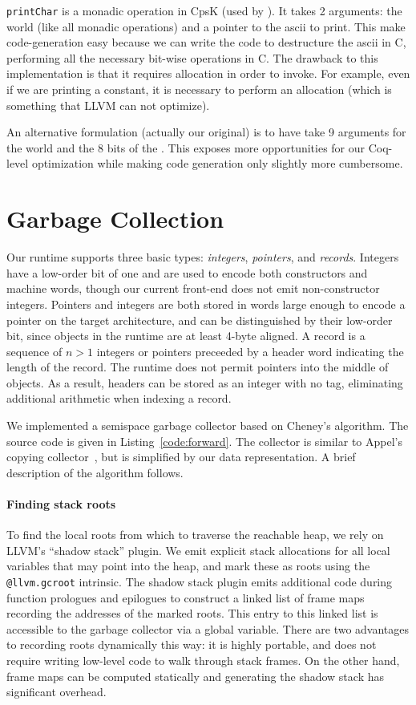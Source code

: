 \documentclass{article}
\begin{document}
\lstinline!printChar! is a monadic operation in CpsK (used by ). It takes 2 arguments: the world (like all monadic operations) and a pointer to the ascii to print. This make code-generation easy because we can write the code to destructure the ascii in C, performing all the necessary bit-wise operations in C. The drawback to this implementation is that it requires allocation in order to invoke. For example, even if we are printing a constant, it is necessary to perform an allocation (which is something that LLVM can not optimize). 

An alternative formulation (actually our original) is to have  take 9 arguments for the world and the 8 bits of the . This exposes more opportunities for our Coq-level optimization while making code generation only slightly more cumbersome. 

\section{Garbage Collection}
\label{sec:gc}

Our runtime supports three basic types: \emph{integers}, \emph{pointers}, and \emph{records}. Integers have a low-order bit of one and are used to encode both constructors and machine words, though our current front-end does not emit non-constructor integers. Pointers and integers are both stored in words large enough to encode a pointer on the target architecture, and can be distinguished by their low-order bit, since objects in the runtime are at least 4-byte aligned. A record is a sequence of $n > 1$ integers or pointers preceeded by a header word indicating the length of the record. The runtime does not permit pointers into the middle of objects. As a result, headers can be stored as an integer with no tag, eliminating additional arithmetic when indexing a record.

We implemented a semispace garbage collector based on Cheney's algorithm. The source code is given in Listing~\ref{code:forward}. The collector is similar to Appel's copying collector~\cite{Appel90aruntime}, but is simplified by our data representation. A brief description of the algorithm follows.

\paragraph{Finding stack roots} To find the local roots from which to traverse the reachable heap, we rely on LLVM's ``shadow stack'' plugin. We emit explicit stack allocations for all local variables that may point into the heap, and mark these as roots using the \lstinline!@llvm.gcroot! intrinsic. The shadow stack plugin emits additional code during function prologues and epilogues to construct a linked list of frame maps recording the addresses of the marked roots. This entry to this linked list is accessible to the garbage collector via a global variable. There are two advantages to recording roots dynamically this way: it is highly portable, and does not require writing low-level code to walk through stack frames. On the other hand, frame maps can be computed statically and generating the shadow stack has significant overhead.
\end{document}
